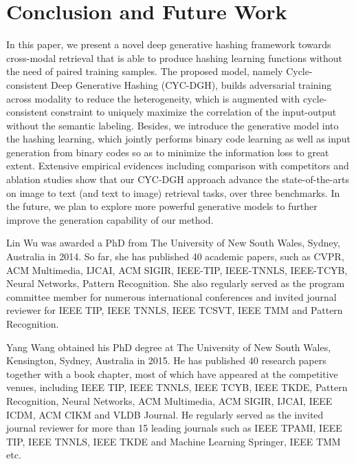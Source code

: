 \documentclass[10pt,journal,twocolumn]{IEEEtran}
\begin{document}
\section{Conclusion and Future Work}\label{sec:con}

In this paper, we present a novel deep generative hashing framework towards cross-modal retrieval that is able to produce hashing learning functions without the need of paired training samples. The proposed model, namely Cycle-consistent Deep Generative Hashing (CYC-DGH), builds adversarial training across modality to reduce the heterogeneity, which is augmented with cycle-consistent constraint to uniquely maximize the correlation of the input-output without the semantic labeling. Besides, we introduce the generative model into the hashing learning, which jointly performs binary code learning as well as input generation from binary codes so as to minimize the information loss to great extent. Extensive empirical evidences including comparison with competitors and ablation studies show that our CYC-DGH approach advance the state-of-the-arts on image to text (and text to image) retrieval tasks, over three benchmarks. In the future, we plan to explore more powerful generative models to further improve the generation capability of our method.


\small


\begin{IEEEbiography}{Lin Wu}
was awarded a PhD from The University of New South Wales, Sydney, Australia in 2014.  So far, she has published 40 academic papers, such as CVPR, ACM Multimedia, IJCAI, ACM SIGIR, IEEE-TIP, IEEE-TNNLS, IEEE-TCYB, Neural Networks, Pattern Recognition.  She also regularly served as the program committee member for numerous international conferences and invited journal reviewer for IEEE TIP, IEEE TNNLS, IEEE TCSVT, IEEE TMM and Pattern Recognition.
\end{IEEEbiography}
\begin{IEEEbiography}{Yang Wang}
obtained his PhD degree at The University of New South Wales, Kensington, Sydney, Australia in 2015.  He has published 40 research papers together with a book chapter, most of which have appeared at the competitive venues, including IEEE TIP, IEEE TNNLS, IEEE TCYB, IEEE TKDE, Pattern Recognition, Neural Networks, ACM Multimedia, ACM SIGIR, IJCAI, IEEE ICDM, ACM CIKM and VLDB Journal.  He regularly served as the invited journal reviewer for more than 15 leading journals such as IEEE TPAMI, IEEE TIP, IEEE TNNLS, IEEE TKDE and Machine Learning Springer, IEEE TMM etc.
\end{IEEEbiography}
\end{document}
